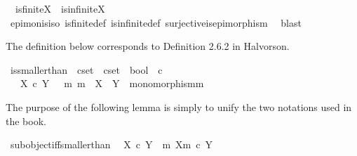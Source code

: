 \begin{isabellebody}
\ \ {\isachardoublequoteopen}is{\isacharunderscore}{\kern0pt}finite{\isacharparenleft}{\kern0pt}X{\isacharparenright}{\kern0pt}\ {\isasymor}\ is{\isacharunderscore}{\kern0pt}infinite{\isacharparenleft}{\kern0pt}X{\isacharparenright}{\kern0pt}{\isachardoublequoteclose}\isanewline
%
\isadelimproof
\ \ %
\endisadelimproof
%
\isatagproof
{}\isamarkupfalse%
\ epi{\isacharunderscore}{\kern0pt}mon{\isacharunderscore}{\kern0pt}is{\isacharunderscore}{\kern0pt}iso\ is{\isacharunderscore}{\kern0pt}finite{\isacharunderscore}{\kern0pt}def\ is{\isacharunderscore}{\kern0pt}infinite{\isacharunderscore}{\kern0pt}def\ surjective{\isacharunderscore}{\kern0pt}is{\isacharunderscore}{\kern0pt}epimorphism\ \isamarkupfalse%
\ blast%
\endisatagproof
{\isafoldproof}%
%
\isadelimproof
%
\endisadelimproof
%
\begin{isamarkuptext}%
The definition below corresponds to Definition 2.6.2 in Halvorson.%
\end{isamarkuptext}\isamarkuptrue%
\isamarkupfalse%
\ is{\isacharunderscore}{\kern0pt}smaller{\isacharunderscore}{\kern0pt}than\ {\isacharcolon}{\kern0pt}{\isacharcolon}{\kern0pt}\ {\isachardoublequoteopen}cset\ {\isasymRightarrow}\ cset\ {\isasymRightarrow}\ bool{\isachardoublequoteclose}\ {\isacharparenleft}{\kern0pt}\ {\isachardoublequoteopen}{\isasymle}\isactrlsub c{\isachardoublequoteclose}\ {}{}{\isacharparenright}{\kern0pt}\ \isanewline
\ \ \ {\isachardoublequoteopen}X\ {\isasymle}\isactrlsub c\ Y\ {\isasymlongleftrightarrow}\ {\isacharparenleft}{\kern0pt}{\isasymexists}\ m{\isachardot}{\kern0pt}\ m\ {\isacharcolon}{\kern0pt}\ X\ {\isasymrightarrow}\ Y\ {\isasymand}\ monomorphism{\isacharparenleft}{\kern0pt}m{\isacharparenright}{\kern0pt}{\isacharparenright}{\kern0pt}{\isachardoublequoteclose}%
\begin{isamarkuptext}%
The purpose of the following lemma is simply to unify the two notations used in the book.%
\end{isamarkuptext}\isamarkuptrue%
\isamarkupfalse%
\ subobject{\isacharunderscore}{\kern0pt}iff{\isacharunderscore}{\kern0pt}smaller{\isacharunderscore}{\kern0pt}than{\isacharcolon}{\kern0pt}\isanewline
\ \ {\isachardoublequoteopen}{\isacharparenleft}{\kern0pt}X\ {\isasymle}\isactrlsub c\ Y{\isacharparenright}{\kern0pt}\ {\isacharequal}{\kern0pt}\ {\isacharparenleft}{\kern0pt}{\isasymexists}m{\isachardot}{\kern0pt}\ {\isacharparenleft}{\kern0pt}X{\isacharcomma}{\kern0pt}m{\isacharparenright}{\kern0pt}\ {\isasymsubseteq}\isactrlsub c\ Y{\isacharparenright}{\kern0pt}{\isachardoublequoteclose}\isanewline

\end{isabellebody}
